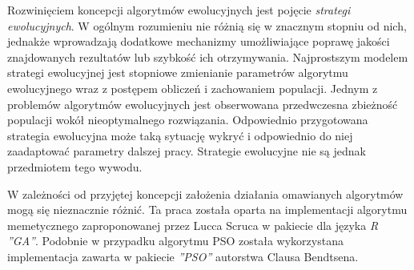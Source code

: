 \par 
Rozwinięciem koncepcji algorytmów ewolucyjnych jest pojęcie \emph{strategi ewolucyjnych}. W ogólnym rozumieniu nie różnią się w znacznym stopniu od nich, jednakże wprowadzają dodatkowe mechanizmy umożliwiające poprawę jakości znajdowanych rezultatów lub szybkość ich otrzymywania. Najprostszym modelem strategi ewolucyjnej jest stopniowe zmienianie parametrów algorytmu ewolucyjnego wraz z postępem obliczeń i zachowaniem populacji. Jednym z problemów algorytmów ewolucyjnych jest obserwowana przedwczesna zbieżność populacji wokół nieoptymalnego rozwiązania. Odpowiednio przygotowana strategia ewolucyjna może taką sytuację wykryć i odpowiednio do niej zaadaptować parametry dalszej pracy. Strategie ewolucyjne nie są jednak przedmiotem tego wywodu.
\par
W zależności od przyjętej koncepcji założenia działania omawianych algorytmów mogą się nieznacznie różnić. Ta praca została oparta na implementacji algorytmu memetycznego zaproponowanej przez Lucca Scruca w pakiecie dla języka \emph{R ''GA''}\cite{gaPackage}. Podobnie w przypadku algorytmu PSO została wykorzystana implementacja zawarta w pakiecie \emph{''PSO''} autorstwa Clausa Bendtsena\cite{psoPackage}.


